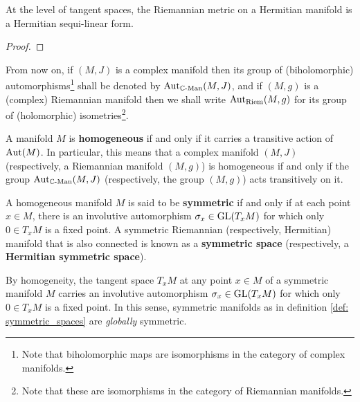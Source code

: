             \begin{proposition}
                At the level of tangent spaces, the Riemannian metric on a Hermitian manifold is a Hermitian sequi-linear form.
            \end{proposition}
                \begin{proof}
                            
                \end{proof}
            
            \begin{convention}
                From now on, if $(M, J)$ is a complex manifold then its group of (biholomorphic) automorphisms\footnote{Note that biholomorphic maps are isomorphisms in the category of complex manifolds.} shall be denoted by $\mathrm{Aut}_{\mathbb{C}\text{-}\mathrm{Man}}(M, J)$, and if $(M, g)$ is a (complex) Riemannian manifold then we shall write $\mathrm{Aut}_{\mathrm{Riem}}(M, g)$ for its group of (holomorphic) isometries\footnote{Note that these are isomorphisms in the category of Riemannian manifolds.}.
            \end{convention}
            \begin{definition} \label{def: homogeneous_manifolds}
                A manifold $M$ is \textbf{homogeneous} if and only if it carries a transitive action of $\mathrm{Aut}(M)$. In particular, this means that a complex manifold $(M, J)$ (respectively, a Riemannian manifold $(M, g)$) is homogeneous if and only if the group $\mathrm{Aut}_{\mathbb{C}\text{-}\mathrm{Man}}(M, J)$ (respectively, the group $(M, g)$) acts transitively on it.
            \end{definition}
            \begin{definition} \label{def: symmetric_spaces}
                A homogeneous manifold $M$ is said to be \textbf{symmetric} if and only if at each point $x \in M$, there is an involutive automorphism $\sigma_x \in \operatorname{GL}(T_xM)$ for which only $0 \in T_xM$ is a fixed point. A symmetric Riemannian (respectively, Hermitian) manifold that is also connected is known as a \textbf{symmetric space} (respectively, a \textbf{Hermitian symmetric space}).
            \end{definition}
            \begin{remark}
                By homogeneity, the tangent space $T_xM$ at any point $x \in M$ of a symmetric manifold $M$ carries an involutive automorphism $\sigma_x \in \operatorname{GL}(T_xM)$ for which only $0 \in T_xM$ is a fixed point. In this sense, symmetric manifolds as in definition \ref{def: symmetric_spaces} are \textit{globally} symmetric.
            \end{remark}
